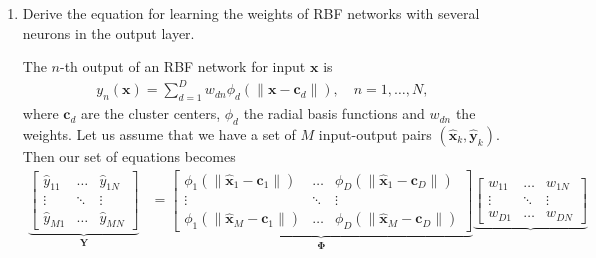 \begin{enumerate}
\begin{solution}
  \end{solution}

\item Derive the equation for learning the weights of RBF networks
  with several neurons in the output layer.


  \begin{solution}

    The $n$-th output of an RBF network for input $\mathbf{x}$ is
    \begin{align*}
      y_n(\mathbf{x}) = \sum^D_{d=1} w_{dn}
      \phi_d(\|\mathbf{x}-\mathbf{c}_d\|), \quad n=1,\ldots,N,
    \end{align*}
    where $\mathbf{c}_d$ are the cluster centers, $\phi_d$ the radial
    basis functions and $w_{dn}$ the weights.  Let us assume that we
    have a set of $M$ input-output pairs $(\hat{\mathbf{x}}_k,
    \hat{\mathbf{y}}_k)$.  Then our set of equations becomes
    \begin{align*}
      \underbrace{
        \begin{bmatrix}
          \hat{y}_{11} & \ldots & \hat{y}_{1N}
          \\
          \vdots & \ddots & \vdots
          \\
          \hat{y}_{M1} & \ldots & \hat{y}_{MN}
        \end{bmatrix}
      }_{\mathbf{Y}}
      &=
      \underbrace{
        \begin{bmatrix}
          \phi_1(\|\hat{\mathbf{x}}_1-\mathbf{c}_1\|) & \ldots &
          \phi_D(\|\hat{\mathbf{x}}_1-\mathbf{c}_D\|) 
          \\
          \vdots & \ddots & \vdots
          \\
          \phi_1(\|\hat{\mathbf{x}}_M-\mathbf{c}_1\|) & \ldots &
          \phi_D(\|\hat{\mathbf{x}}_M-\mathbf{c}_D\|)
        \end{bmatrix}
      }_{\mathbf{\Phi}}
      \underbrace{
        \begin{bmatrix}
          w_{11} & \ldots & w_{1N}
          \\
          \vdots & \ddots & \vdots
          \\
          w_{D1} & \ldots & w_{DN}
        \end{bmatrix}
}
\end{align*}
\end{solution}
\end{enumerate}
